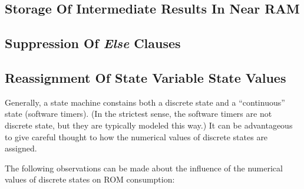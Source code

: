 \subsection{Storage Of Intermediate Results In Near RAM}
\label{cpco0:srrs0:ssir0}


\subsection{Suppression Of \emph{Else} Clauses}
\label{cpco0:srrs0:ssec0}


\subsection{Reassignment Of State Variable State Values}
\label{cpco0:srrs0:srsv0}

Generally, a state machine constains both a discrete state and a
``continuous'' state (software timers).  (In the strictest sense,
the software timers are not discrete state, but they are typically
modeled this way.)  It can be advantageous to give careful thought
to how the numerical values of discrete states are assigned.

The following observations can be made about the influence of the
numerical values of discrete states on ROM consumption:

